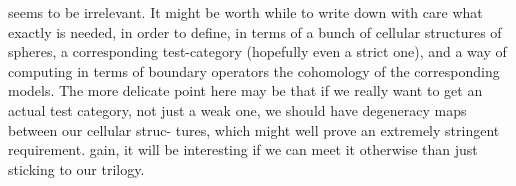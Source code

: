 
seems to be irrelevant.  It might be worth while to write down with care
what exactly is needed,  in order to define,  in terms of a bunch of
cellular structures\xout{,} of spheres,  a corresponding test-category (hopefully
even a strict one),  and a way of computing in terms of boundary operators
the cohomology of the corresponding models.  The more delicate point here
may be that if we really want to get an actual test category,  not just a
 weak one,  we should have  degeneracy maps between our cellular struc-%
tures,  which might well prove an extremely stringent requirement.  gain,
it will be interesting if we can meet it otherwise than just sticking to
our trilogy.

